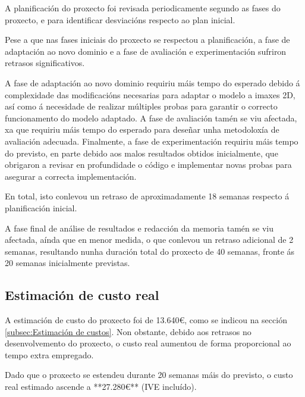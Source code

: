 A planificación do proxecto foi revisada periodicamente segundo as fases do proxecto, e para identificar desviacións respecto ao plan inicial.

Pese a que nas fases iniciais do proxecto se respectou a planificación, a fase de adaptación ao novo dominio e a fase de avaliación e experimentación sufriron retrasos significativos.

A fase de adaptación ao novo dominio requiriu máis tempo do esperado debido á complexidade das modificacións necesarias para adaptar o modelo a imaxes 2D, así como á necesidade de realizar múltiples probas para garantir o correcto funcionamento do modelo adaptado. A fase de avaliación tamén se viu afectada, xa que requiriu máis tempo do esperado para deseñar unha metodoloxía de avaliación adecuada. Finalmente, a fase de experimentación requiriu máis tempo do previsto, en parte debido aos malos resultados obtidos inicialmente, que obrigaron a revisar en profundidade o código e implementar novas probas para asegurar a correcta implementación.

En total, isto conlevou un retraso de aproximadamente 18 semanas respecto á planificación inicial.

A fase final de análise de resultados e redacción da memoria tamén se viu afectada, aínda que en menor medida, o que conlevou un retraso adicional de 2 semanas, resultando nunha duración total do proxecto de 40 semanas, fronte ás 20 semanas inicialmente previstas.

\subsection{Estimación de custo real}
\label{subsec:Estimación de custo real}

A estimación de custo do proxecto foi de 13.640€, como se indicou na sección \ref{subsec:Estimación de custos}. Non obstante, debido aos retrasos no desenvolvemento do proxecto, o custo real aumentou de forma proporcional ao tempo extra empregado.

Dado que o proxecto se estendeu durante 20 semanas máis do previsto, o custo real estimado ascende a **27.280€**  (IVE incluído).